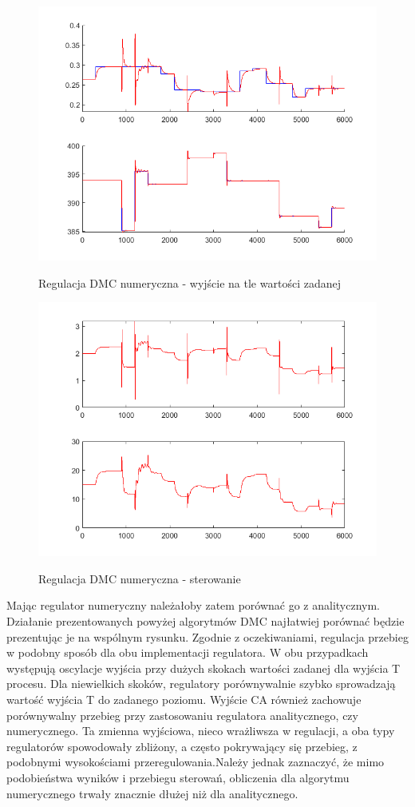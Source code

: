 \begin{figure}[h!]
	\centering
	\includegraphics[width=.7\linewidth]{img/yDMCnum.png}
	\label{ch2:dmcnum}
	\caption{Regulacja DMC numeryczna - wyjście na tle wartości zadanej}
\end{figure}
\begin{figure}[h!]
	\centering
	\includegraphics[width=.7\linewidth]{img/uDMCnum.png}
	\label{ch2:dmcnumster}
	\caption{Regulacja DMC numeryczna - sterowanie}
\end{figure}
\newpage
Mając regulator numeryczny należałoby zatem porównać go z analitycznym. Działanie prezentowanych powyżej algorytmów DMC najłatwiej porównać będzie prezentując je na wspólnym rysunku. Zgodnie z oczekiwaniami, regulacja przebieg w podobny sposób dla obu implementacji regulatora. W obu przypadkach występują oscylacje wyjścia przy dużych skokach wartości zadanej dla wyjścia T procesu. Dla niewielkich skoków, regulatory porównywalnie szybko sprowadzają wartość wyjścia T do zadanego poziomu. Wyjście CA również zachowuje porównywalny przebieg przy zastosowaniu regulatora analitycznego, czy numerycznego. Ta zmienna wyjściowa, nieco wrażliwsza w regulacji, a oba typy regulatorów spowodowały zbliżony, a często pokrywający się przebieg, z podobnymi wysokościami przeregulowania.Należy jednak zaznaczyć, że mimo podobieństwa wyników i przebiegu sterowań, obliczenia dla algorytmu numerycznego trwały znacznie dłużej niż dla analitycznego.
